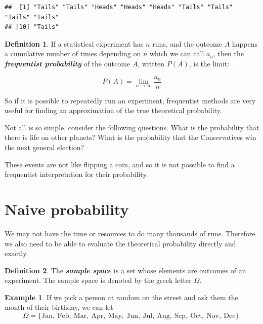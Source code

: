 \documentclass[
]{book}
\theoremstyle{definition}
\newtheorem{definition}{Definition}[chapter]
\theoremstyle{definition}
\newtheorem{example}{Example}[chapter]
\theoremstyle{definition}
\theoremstyle{definition}
\theoremstyle{remark}
\begin{document}
\begin{verbatim}
##  [1] "Tails" "Tails" "Heads" "Heads" "Heads" "Tails" "Tails" "Tails" "Tails"
## [10] "Tails"
\end{verbatim}

\begin{definition}
\protect\hypertarget{def:freq}{}\label{def:freq}If a statistical experiment has \(n\) runs, and the outcome \(A\) happens a cumulative number of times depending on \(n\) which we can call \(a_n\), then the \textbf{\emph{frequentist probability}} of the outcome \(A\), written \(P(A)\), is the limit:

\[P(A) = \lim_{n\to \infty} \frac{a_n}{n}\]
\end{definition}

So if it is possible to repeatedly run an experiment, frequentist methods are very useful for finding an approximation of the true theoretical probability.

Not all is so simple, consider the following questions. What is the probability that there is life on other planets? What is the probability that the Conservatives win the next general election?

These events are not like flipping a coin, and so it is not possible to find a frequentist interpretation for their probability.

\hypertarget{naive-probability}{%
\section{Naive probability}\label{naive-probability}}

We may not have the time or resources to do many thousands of runs. Therefore we also need to be able to evaluate the theoretical probability directly and exactly.

\begin{definition}
\protect\hypertarget{def:samplespace}{}\label{def:samplespace}The \textbf{\emph{sample space}} is a set whose elements are outcomes of an experiment. The sample space is denoted by the greek letter \(\Omega\).
\end{definition}

\begin{example}
\protect\hypertarget{exm:monthspace}{}\label{exm:monthspace}If we pick a person at random on the street and ask them the month of their birthday,
we can let
\[\Omega = \{\text{Jan}, \ \text{Feb}, \ \text{Mar},  \ \text{Apr}, \ \text{May}, \ \text{Jun}, \ \text{Jul}, \ \text{Aug}, \ \text{Sep}, \ \text{Oct}, \ \text{Nov}, \ \text{Dec} \}.\]
\end{example}
\end{document}
